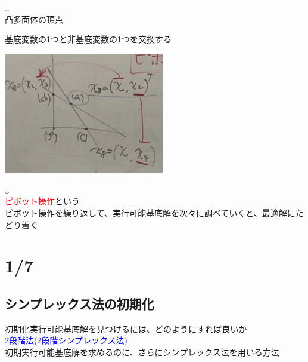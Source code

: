 \documentclass{jsarticle}
\begin{document}
{{\begin{description}
\begin{center}
			\end{center}
			↓\\
			凸多面体の頂点
		\item [2. 隣接する頂点に移動する]
			基底変数の1つと非基底変数の1つを交換する\\
			\begin{center}
				\includegraphics[width=7cm]{12_17_14.JPG}
			\end{center}
			↓\\
			\textcolor{red}{\large{ピボット操作}}という\\
			ピボット操作を繰り返して、実行可能基底解を次々に調べていくと、最適解にたどり着く
	\end{description}
	
\section{1/7}
\subsection{シンプレックス法の初期化}
初期化実行可能基底解を見つけるには、どのようにすれば良いか\\
{\textcolor{blue}{\Large{2段階法(2段階シンプレックス法)}}\\
初期実行可能基底解を求めるのに、さらにシンプレックス法を用いる方法\\
}}}
\end{document}
